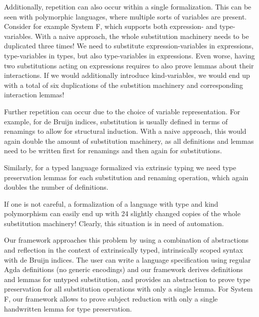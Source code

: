 \documentclass[a4paper, UKenglish, cleveref, autoref, thm-restate]{lipics-v2021}
\begin{document}
  Additionally, repetition can also occur within a single formalization.
  This can be seen with polymorphic languages, where multiple sorts
  of variables are present.
  Consider for example System F, which supports both expression- and
  type-variables.
  With a naive approach, the whole substitution machinery needs to be
  duplicated three times! We need to substitute expression-variables in
  expressions, type-variables in types, but also type-variables in
  expressions.
  Even worse, having two substitutions acting on expressions requires
  to also prove lemmas about their interactions.
  If we would additionally introduce kind-variables, we would end up
  with a total of six duplications of the substition machinery and
  corresponding interaction lemmas!
  
  Further repetition can occur due to the choice of variable
  representation. For example, for de Bruijn indices, substitution is
  usually defined in terms of renamings to allow for structural
  induction.
  With a naive approach, this would again double the amount of
  substitution machinery, as all definitions and lemmas need to be
  written first for renamings and then again for substitutions.

  Similarly, for a typed language formalized via extrinsic typing we
  need type preservation lemmas for each substitution and renaming
  operation, which again doubles the number of definitions.

  If one is not careful, a formalization of a language with type and
  kind polymorphism can easily end up with 24 slightly changed copies of
  the whole substitution machinery!
  Clearly, this situation is in need of automation.

  Our framework approaches this problem by using a combination of
  abstractions and reflection in the context of extrinsically typed,
  intrinsically scoped syntax with de Bruijn indices.
  The user can write a language specification using regular Agda
  definitions (no generic encodings) and our framework derives
  definitions and lemmas for untyped substitution, and provides an
  abstraction to prove type preservation for all substitution operations
  with only a single lemma. For System F, our framework allows to prove
  subject reduction with only a single handwritten lemma for type
  preservation.
\end{document}
